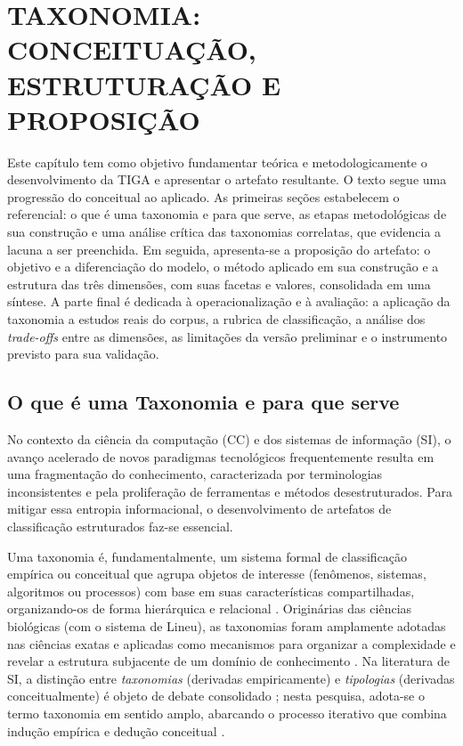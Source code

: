 \chapter{TAXONOMIA: CONCEITUAÇÃO, ESTRUTURAÇÃO E PROPOSIÇÃO}
\label{cap:taxonomia}

Este capítulo tem como objetivo fundamentar teórica e metodologicamente o desenvolvimento da TIGA e apresentar o artefato resultante. O texto segue uma progressão do conceitual ao aplicado. As primeiras seções estabelecem o referencial: o que é uma taxonomia e para que serve, as etapas metodológicas de sua construção e uma análise crítica das taxonomias correlatas, que evidencia a lacuna a ser preenchida. Em seguida, apresenta-se a proposição do artefato: o objetivo e a diferenciação do modelo, o método aplicado em sua construção e a estrutura das três dimensões, com suas facetas e valores, consolidada em uma síntese. A parte final é dedicada à operacionalização e à avaliação: a aplicação da taxonomia a estudos reais do corpus, a rubrica de classificação, a análise dos \textit{trade-offs} entre as dimensões, as limitações da versão preliminar e o instrumento previsto para sua validação.

\section{O que é uma Taxonomia e para que serve}

No contexto da ciência da computação (CC) e dos sistemas de informação (SI), o avanço acelerado de novos paradigmas tecnológicos frequentemente resulta em uma fragmentação do conhecimento, caracterizada por terminologias inconsistentes e pela proliferação de ferramentas e métodos desestruturados. Para mitigar essa entropia informacional, o desenvolvimento de artefatos de classificação estruturados faz-se essencial.

Uma taxonomia é, fundamentalmente, um sistema formal de classificação empírica ou conceitual que agrupa objetos de interesse (fenômenos, sistemas, algoritmos ou processos) com base em suas características compartilhadas, organizando-os de forma hierárquica e relacional \citep{nickerson2013method, bailey1994}. Originárias das ciências biológicas (com o sistema de Lineu), as taxonomias foram amplamente adotadas nas ciências exatas e aplicadas como mecanismos para organizar a complexidade e revelar a estrutura subjacente de um domínio de conhecimento \citep{glass1995}. Na literatura de SI, a distinção entre \textit{taxonomias} (derivadas empiricamente) e \textit{tipologias} (derivadas conceitualmente) é objeto de debate consolidado \citep{bailey1994, doty1994}; nesta pesquisa, adota-se o termo taxonomia em sentido amplo, abarcando o processo iterativo que combina indução empírica e dedução conceitual \citep{nickerson2013method}.

